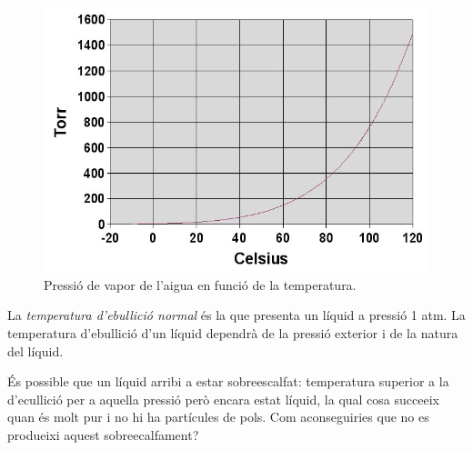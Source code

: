 \begin{figure}[h]
\centering
\includegraphics[scale=0.4]{figures/Water_vapor_pressure_graph.png}
\caption{Pressió de vapor de l'aigua en funció de la temperatura.}
\label{fig:Water_vapor_pressure_graph}
\end{figure}

La \emph{temperatura d'ebullició normal} és la que presenta un líquid a pressió 1 atm. La temperatura d'ebullició d'un líquid dependrà de la pressió exterior i de la natura del líquid.

\begin{exr}
És possible que un líquid arribi a estar sobreescalfat: temperatura superior a la d'ecullició per a aquella pressió però encara estat líquid, la qual cosa succeeix quan és molt pur i no hi ha partícules de pols.
Com aconseguiries que no es produeixi aquest sobreecalfament?
\end{exr} 

